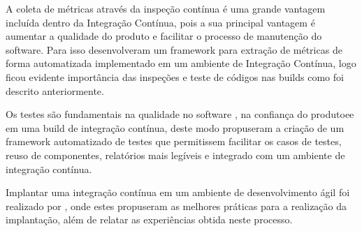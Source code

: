 A coleta de métricas através da inspeção contínua é uma grande vantagem incluída dentro da Integração Contínua, pois a sua principal vantagem é aumentar a qualidade do produto e facilitar o processo de manutenção do software. Para isso  desenvolveram um framework para extração de métricas de forma automatizada implementado em um ambiente de Integração Contínua, logo ficou evidente importância das inspeções e teste de códigos nas builds como foi descrito anteriormente.

Os testes são fundamentais na qualidade no software , na confiança do produtoee em uma build de integração contínua, deste modo  propuseram a criação de um framework automatizado de testes que permitissem facilitar os casos de testes, reuso de componentes, relatórios mais legíveis e integrado com um ambiente de integração contínua.

Implantar uma integração contínua em um ambiente de desenvolvimento ágil foi realizado por , onde estes propuseram as melhores práticas para a realização da implantação, além de relatar as experiências obtida neste processo.
